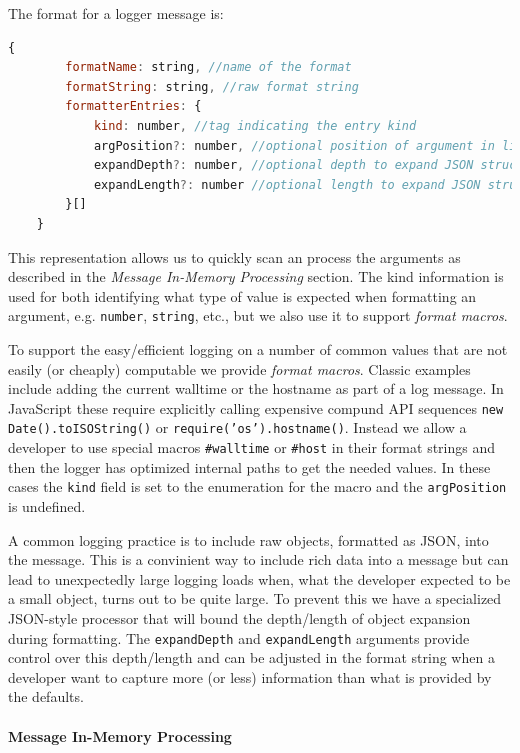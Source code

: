 The format for a logger message is:
\begin{lstlisting}[language=JavaScript,basicstyle=\small]
    {
        formatName: string, //name of the format
        formatString: string, //raw format string
        formatterEntries: {
            kind: number, //tag indicating the entry kind
            argPosition?: number, //optional position of argument in list
            expandDepth?: number, //optional depth to expand JSON structures
            expandLength?: number //optional length to expand JSON structures
        }[]
    }
\end{lstlisting}

This representation allows us to quickly scan an process the arguments as 
described in the \emph{Message In-Memory Processing} section. The kind 
information is used for both identifying what type of value is expected 
when formatting an argument, e.g. \texttt{number}, \texttt{string}, etc., 
but we also use it to support \emph{format macros}.

To support the easy/efficient logging on a number of common values that 
are not easily (or cheaply) computable we provide \emph{format macros}. 
Classic examples include adding the current walltime or the hostname as 
part of a log message. In JavaScript these require explicitly calling 
expensive compund API sequences \texttt{new Date().toISOString()} or 
\texttt{require('os').hostname()}. Instead we allow a developer to use 
special macros \texttt{\#walltime} or \texttt{\#host} in their format 
strings and then the logger has optimized internal paths to get the needed 
values. In these cases the \texttt{kind} field is set to the enumeration 
for the macro and the \texttt{argPosition} is undefined.

A common logging practice is to include raw objects, formatted as JSON, into the 
message. This is a convinient way to include rich data into a message but can 
lead to unexpectedly large logging loads when, what the developer expected to 
be a small object, turns out to be quite large. To prevent this we have a specialized 
JSON-style processor that will bound the depth/length of object expansion during 
formatting. The \texttt{expandDepth} and \texttt{expandLength} arguments provide 
control over this depth/length and can be adjusted in the format string when a 
developer want to capture more (or less) information than what is provided by the 
defaults.

\paragraph{Message In-Memory Processing}
\noindent

